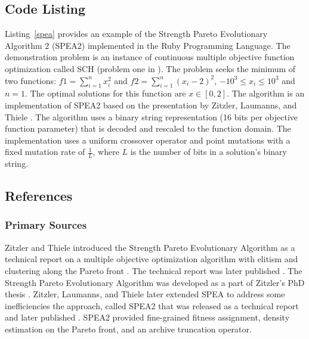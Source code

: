 \subsection{Code Listing}
Listing~\ref{spea} provides an example of the Strength Pareto Evolutionary Algorithm 2 (SPEA2) implemented in the Ruby Programming Language.
The demonstration problem is an instance of continuous multiple objective function optimization called SCH (problem one in \cite{Deb2002}). The problem seeks the minimum of two functions: $f1=\sum_{i=1}^n x_{i}^2$ and $f2=\sum_{i=1}^n (x_{i}-2)^2$, $-10^3\leq x_i \leq 10^3$ and $n=1$. The optimal solutions for this function are $x \in [0,2]$.
The algorithm is an implementation of SPEA2 based on the presentation by Zitzler, Laumanns, and Thiele \cite{Zitzler2002}.
The algorithm uses a binary string representation (16 bits per objective function parameter) that is decoded and rescaled to the function domain. The implementation uses a uniform crossover operator and point mutations with a fixed mutation rate of $\frac{1}{L}$, where $L$ is the number of bits in a solution's binary string. 



\subsection{References}

% 
% 
\subsubsection{Primary Sources}
Zitzler and Thiele introduced the Strength Pareto Evolutionary Algorithm as a technical report on a multiple objective optimization algorithm with elitism and clustering along the Pareto front \cite{Zitzler1998}. The technical report was later published \cite{Zitzler1999}.
The Strength Pareto Evolutionary Algorithm was developed as a part of Zitzler's PhD thesis \cite{Zitzler1999a}.
Zitzler, Laumanns, and Thiele later extended SPEA to address some inefficiencies the approach, called SPEA2 that was released as a technical report \cite{Zitzler2001} and later published \cite{Zitzler2002}. SPEA2 provided fine-grained fitness assignment, density estimation on the Pareto front, and an archive truncation operator.

